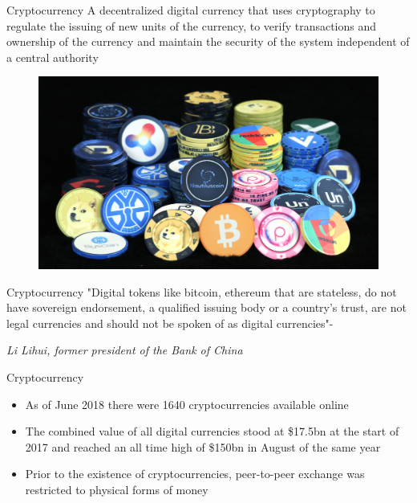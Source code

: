 \documentclass[10pt]{beamer}
\begin{document}

\begin{frame}{Cryptocurrency}
	A decentralized digital currency that uses cryptography to regulate the issuing of new units of the currency, to verify transactions and ownership of the currency and maintain the security of the system independent of a central authority
	\begin{figure}[]
		\centering
		\includegraphics  [width=2.in]{Images/cryptocurrency}
	\end{figure}
\end{frame}



\begin{frame}{Cryptocurrency}
	"Digital tokens like bitcoin, ethereum that are stateless, do not have sovereign endorsement, a qualified issuing body or a country's trust, are not legal currencies and should not be spoken of as digital currencies"- \begin{scriptsize}
	\textit{Li Lihui, former president of the Bank of China}
	\end{scriptsize}
\end{frame}



\begin{frame}{Cryptocurrency}
	\begin{itemize}
		\item As of June 2018 there were 1640 cryptocurrencies available online
		\item The combined value of all digital currencies stood at \$17.5bn at the start of 2017 and reached an all time high of \$150bn in August of the same year
		\item Prior to the existence of cryptocurrencies, peer-to-peer exchange was restricted to physical forms of money
	\end{itemize}
\end{frame}

\end{document}
